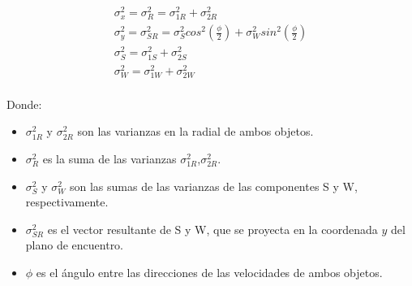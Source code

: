 \begin{gather*}
\sigma_{x}^{2}=\sigma_{R}^{2}=\sigma_{1R}^{2}+\sigma_{2R}^{2}\\
\sigma_{y}^{2}=\sigma_{SR}^{2}=\sigma_{S}^{2}cos^{2}(\frac{\phi}{2})+\sigma_{W}^{2}sin^{2}(\frac{\phi}{2})\\
\sigma_{S}^{2}=\sigma_{1S}^{2}+\sigma_{2S}^{2}\\
\sigma_{W}^{2}=\sigma_{1W}^{2}+\sigma_{2W}^{2}\\
\end{gather*}

Donde:
\begin{itemize}
 \item $\sigma_{1R}^{2}$ y $\sigma_{2R}^{2}$  son las varianzas en la radial de ambos objetos.
 \item $\sigma_{R}^{2}$ es la suma de las varianzas $\sigma_{1R}^{2}$,$\sigma_{2R}^{2}$.
 \item $\sigma_{S}^{2}$ y $\sigma_{W}^{2}$ son las sumas de las varianzas de las componentes S y W, respectivamente.
 \item $\sigma_{SR}^{2}$ es el vector resultante de S y W, que se proyecta en la coordenada $y$ del plano de encuentro.
 \item $\phi$ es el \'angulo entre las direcciones de las velocidades de ambos objetos.
\end{itemize}


